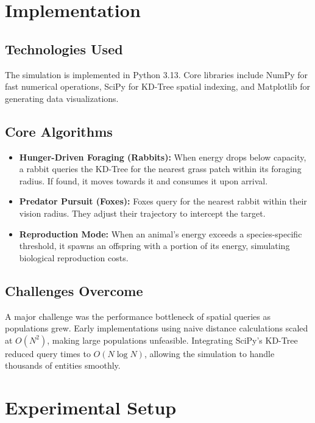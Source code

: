 \documentclass[12pt]{article}
\begin{document}
\section{Implementation}

\subsection{Technologies Used}
The simulation is implemented in Python 3.13. Core libraries include NumPy for fast numerical operations, SciPy for KD-Tree spatial indexing, and Matplotlib for generating data visualizations.

\subsection{Core Algorithms}
\begin{itemize}
    \item \textbf{Hunger-Driven Foraging (Rabbits):} When energy drops below capacity, a rabbit queries the KD-Tree for the nearest grass patch within its foraging radius. If found, it moves towards it and consumes it upon arrival.
    \item \textbf{Predator Pursuit (Foxes):} Foxes query for the nearest rabbit within their vision radius. They adjust their trajectory to intercept the target.
    \item \textbf{Reproduction Mode:} When an animal's energy exceeds a species-specific threshold, it spawns an offspring with a portion of its energy, simulating biological reproduction costs.
\end{itemize}

\subsection{Challenges Overcome}
A major challenge was the performance bottleneck of spatial queries as populations grew. Early implementations using naive distance calculations scaled at $O(N^2)$, making large populations unfeasible. Integrating SciPy's KD-Tree reduced query times to $O(N \log N)$, allowing the simulation to handle thousands of entities smoothly.

\section{Experimental Setup}
\end{document}
